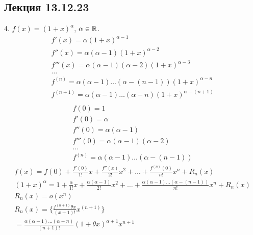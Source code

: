 \subsection{Лекция 13.12.23}

4. $f(x) = (1+x)^\alpha$, $\alpha \in \mathbb{R}$.
\begin{gather*}
  f'(x) = \alpha(1+x)^{\alpha-1} \\
  f''(x) = \alpha(\alpha - 1)(1+x)^{\alpha-2} \\
  f'''(x) = \alpha(\alpha - 1)(\alpha - 2)(1+x)^{\alpha-3} \\
  \ldots \\
  f^{(n)} = \alpha(\alpha - 1)\ldots(\alpha - (n - 1))(1 + x)^{\alpha - n} \\
  f^{(n+1)} = \alpha(\alpha - 1)\ldots(\alpha - n)(1 + x)^{\alpha - (n + 1)} \\
\end{gather*}
\begin{gather*}
  f(0) = 1 \\
  f'(0) = \alpha \\
  f''(0) = \alpha (\alpha - 1) \\
  f'''(0) = \alpha (\alpha - 1)(\alpha - 2) \\
  \ldots \\
  f^{(n)} = \alpha(\alpha - 1) \ldots (\alpha - (n-1))
\end{gather*}
\begin{gather*}
  f(x) = f(0) + \frac{f'(0)}{1!}x + \frac{f''(x)}{2!}x^2 + \ldots + \frac{f^{(n)}(0)}{n!}x^{n} + R_n(x) \\
  (1 + x)^{\alpha} = 1 + \frac{\alpha}{1!}x + \frac{\alpha(\alpha - 1)}{2!}x^2 + \ldots + \frac{\alpha(\alpha - 1)\ldots (\alpha - (n-1))}{n!}x^{n} + R_n(x) \\
  R_n(x) = o(x^n) \\
  R_n(x) = \{ \frac{f^{(n+1)} \theta x}{(x + 1)!}x^{(n+1)} \} \\
    = \frac{\alpha(\alpha - 1) \ldots (\alpha - n)}{(n+1)!} (1 + \theta x)^{\alpha + 1}x^{n+1} \\
\end{gather*}


